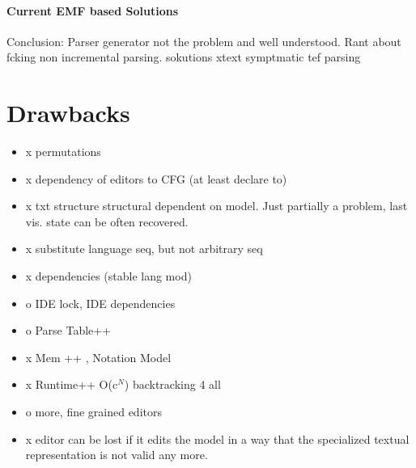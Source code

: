 




\paragraph{Current EMF based Solutions}
Conclusion: Parser generator not the problem and well understood.
Rant about fcking non incremental parsing.
sokutions
xtext
symptmatic
tef
parsing 

\section{Drawbacks}
\begin{itemize}
	\item x permutations
	\item x dependency of editors to CFG (at least declare to)
	\item x txt structure structural dependent on model. Just partially a problem, last vis. state can be often recovered.
	\item x substitute language seq, but not arbitrary seq
	\item x dependencies (stable lang mod)
	\item o IDE lock, IDE dependencies
	\item o Parse Table++
	\item x Mem ++ , Notation Model
	\item x Runtime++ O(c$^N$) backtracking 4 all
	\item o more, fine grained editors
	\item x editor can be lost if it edits the model in a way that the specialized textual representation is not valid any more.
\end{itemize}